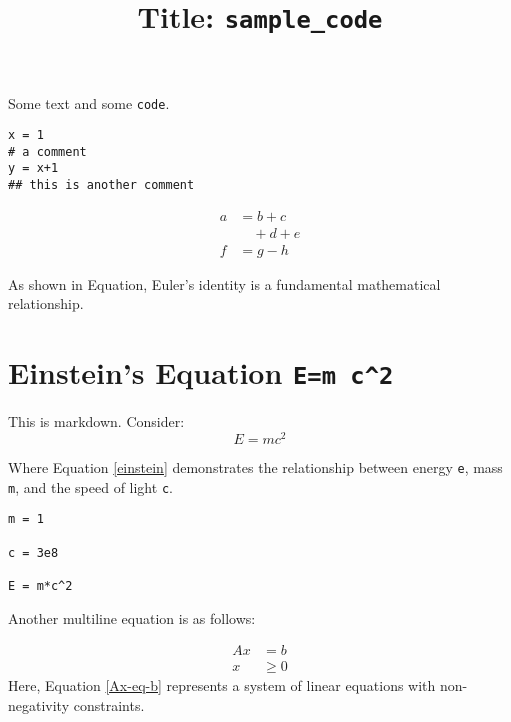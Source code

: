 \documentclass{article}
\title{Title: \texttt{sample\_code}}
\begin{document}
\maketitle


Some text and some \texttt{code}.

\begin{verbatim}
x = 1
# a comment
y = x+1
## this is another comment
\end{verbatim}


\begin{equation*}
\begin{aligned}
  a &= b + c \\
  & \quad + d + e \\
  f &= g - h
\end{aligned}
\end{equation*}



As shown in Equation, Euler's identity is a fundamental mathematical relationship.
\section{Einstein's Equation \texttt{E=m c\textasciicircum{}2}}
This is markdown. Consider: 
\begin{equation}\label{einstein}
E = mc^2
\end{equation}

Where Equation \eqref{einstein} demonstrates the relationship between energy \texttt{e}, mass \texttt{m}, and the speed of light \texttt{c}.

\begin{verbatim}
m = 1

c = 3e8

E = m*c^2
\end{verbatim}


Another multiline equation is as follows: 

\begin{equation}\label{Ax-eq-b}
\begin{aligned}
  Ax &= b \\
  x &\ge 0
\end{aligned}
\end{equation}
Here, Equation \eqref{Ax-eq-b} represents a system of linear equations with non-negativity constraints.
\end{document}
